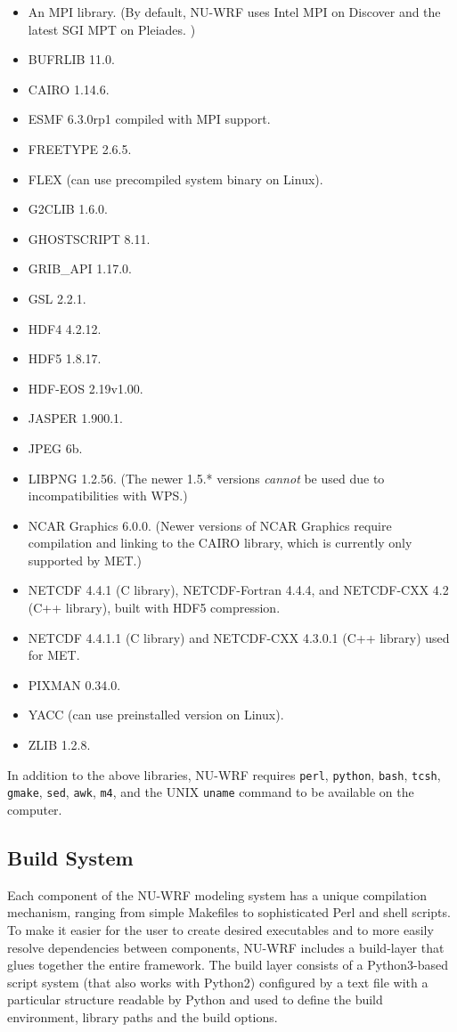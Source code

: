 \begin{itemize}
\item An MPI library. (By default, NU-WRF uses Intel MPI on Discover and
the latest SGI MPT on Pleiades. )
\item BUFRLIB 11.0.
\item CAIRO 1.14.6.
\item ESMF 6.3.0rp1 compiled with MPI support.
\item FREETYPE 2.6.5.
\item FLEX (can use precompiled system binary on Linux).
\item G2CLIB 1.6.0.
\item GHOSTSCRIPT 8.11.
\item GRIB\_API 1.17.0.
\item GSL 2.2.1.
\item HDF4 4.2.12.
\item HDF5 1.8.17.
\item HDF-EOS 2.19v1.00.
\item JASPER 1.900.1.
\item JPEG 6b.
\item LIBPNG 1.2.56. (The newer 1.5.* versions \emph{cannot} be used due to 
  incompatibilities with WPS.)
\item NCAR Graphics 6.0.0. (Newer versions of NCAR Graphics require compilation
and linking to the CAIRO library, which is currently only supported by MET.)
\item NETCDF 4.4.1 (C library), NETCDF-Fortran 4.4.4, and NETCDF-CXX 4.2 
  (C++ library), built with HDF5 compression.
\item NETCDF 4.4.1.1 (C library) and NETCDF-CXX 4.3.0.1
  (C++ library) used for MET.
\item PIXMAN 0.34.0.
\item YACC (can use preinstalled version on Linux).
\item ZLIB 1.2.8.
\end{itemize}

In addition to the above libraries, NU-WRF requires \texttt{perl}, 
\texttt{python}, \texttt{bash}, \texttt{tcsh}, \texttt{gmake}, \texttt{sed}, 
\texttt{awk}, \texttt{m4}, and the UNIX \texttt{uname} command to be available
on the computer. 

\subsection{Build System}
\label{subsec:BuildSystem}
Each component of the NU-WRF modeling system has a unique compilation 
mechanism, ranging from simple Makefiles to sophisticated Perl and shell 
scripts. To make it easier for the user to create desired executables and to 
more easily resolve dependencies between components, NU-WRF includes a 
build-layer that glues together the entire framework. The build layer consists of a
Python3-based script system (that also works with Python2) configured by a text file 
with a particular structure readable by Python and used to define the build environment, 
library paths and  the build options. 

